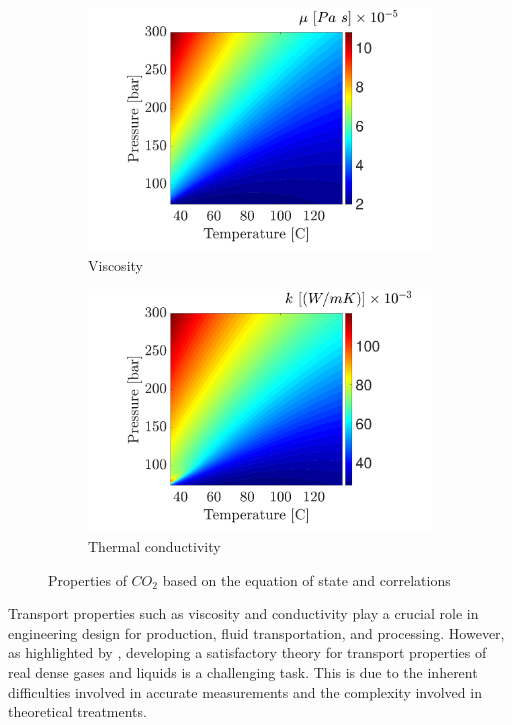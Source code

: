 \documentclass[../Article_Model_Parameters.tex]{subfiles}
\begin{document}
\begin{figure}[H]
\begin{subfigure}[b]{0.32\textwidth}
			\includegraphics[trim = 3.5cm 0cm 1.5cm 0cm,clip,width=\textwidth]{Figures/MU.pdf}
			\caption{Viscosity}
			\label{fig: SFE_Properties_Viscosity}
		\end{subfigure}
		\hfill
		\begin{subfigure}[b]{0.32\textwidth}
			\centering
			\includegraphics[trim = 3.5cm 0cm 1.5cm 0cm,clip,width=\textwidth]{Figures/KT.pdf}	
			\caption{Thermal conductivity}
			\label{fig: SFE_Properties_Thermal}
		\end{subfigure}
		\caption{Properties of $CO_2$ based on the equation of state and correlations}
		\label{fig: SFE_Properties}
	\end{figure}    
	
	Transport properties such as viscosity and conductivity play a crucial role in engineering design for production, fluid transportation, and processing. However, as highlighted by \citet{Sheng1989}, developing a satisfactory theory for transport properties of real dense gases and liquids is a challenging task. This is due to the inherent difficulties involved in accurate measurements and the complexity involved in theoretical treatments.
	
\end{document}
